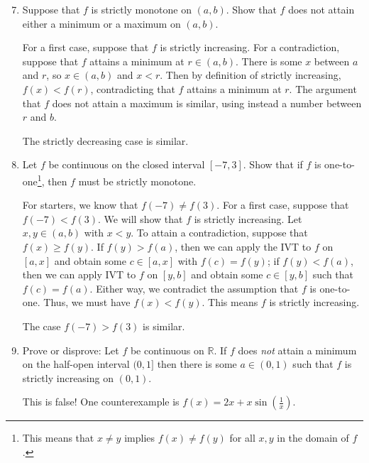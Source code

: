 \documentclass[12pt]{amsart}
\newcommand{\R}{{\mathbb{R}}}
\numberwithin{equation}{section}
\theoremstyle{plain} %
\theoremstyle{definition}
\theoremstyle{remark}
\begin{document}
\begin{enumerate}
\setcounter{enumi}{6}

\item Suppose that $f$ is strictly monotone on $(a,b)$. Show that $f$ does not attain either a minimum or a maximum on $(a,b)$.

\begin{framed}
For a first case, suppose that $f$ is strictly increasing. For a contradiction, suppose that $f$ attains a minimum at $r\in(a,b)$. There is some $x$ between $a$ and $r$, so $x\in (a,b)$ and $x<r$. Then by definition of strictly increasing, $f(x) < f(r)$, contradicting that $f$ attains a minimum at $r$. The argument that $f$ does not attain a maximum is similar, using instead a number between $r$ and $b$. 

The strictly decreasing case is similar.
\end{framed}


\item Let $f$ be continuous on the closed interval $[-7,3]$. Show that if $f$ is one-to-one\footnote{This means that $x\neq y$ implies $f(x) \neq f(y)$ for all $x,y$ in the domain of $f$.}, then $f$ must be strictly monotone.

\begin{framed}
For starters, we know that $f(-7)\neq f(3)$. For a first case, suppose that $f(-7)<f(3)$. We will show that $f$ is strictly increasing. Let $x,y\in (a,b)$ with $x<y$. To attain a contradiction, suppose that $f(x) \geq f(y)$. If $f(y)>f(a)$, then we can apply the IVT to $f$ on $[a,x]$ and obtain some $c\in [a,x]$ with $f(c) = f(y)$; if $f(y)<f(a)$, then we can apply IVT to $f$ on $[y,b]$ and obtain some $c\in[y,b]$ such that $f(c) = f(a)$. Either way, we contradict the assumption that $f$ is one-to-one. Thus, we must have $f(x)< f(y)$. This means $f$ is strictly increasing.

The case $f(-7)>f(3)$ is similar.
\end{framed}

\item Prove or disprove: Let $f$ be continuous on $\R$. If $f$ does \emph{not} attain a minimum on the half-open interval $(0,1]$ then there is some $a\in (0,1)$ such that $f$ is strictly increasing on $(0,1)$.


\begin{framed}
This is false! One counterexample is $f(x) = 2x + x \sin\left(\frac{1}{x}\right)$.


\end{framed}
\end{enumerate}
\end{document}
